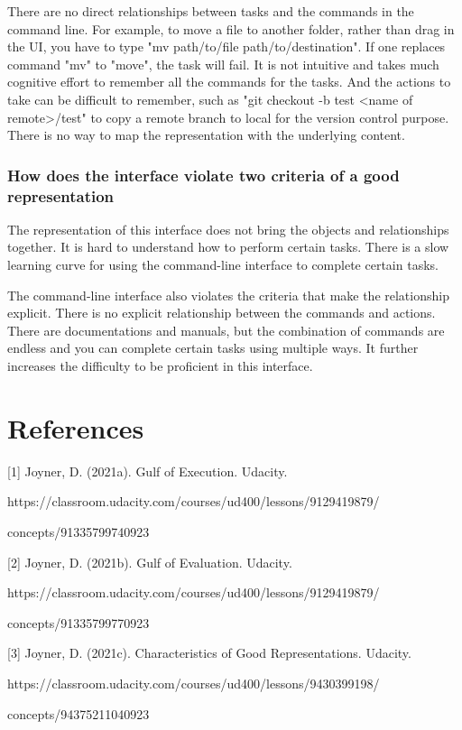 \documentclass[
	letterpaper, %
]{jdf}
\begin{document}
There are no direct relationships between tasks and the commands in the command line. For example, to move a file to another folder, rather than drag in the UI, you have to type "mv path/to/file path/to/destination". If one replaces command "mv" to "move", the task will fail. It is not intuitive and takes much cognitive effort to remember all the commands for the tasks. And the actions to take can be difficult to remember, such as "git checkout -b test <name of remote>/test" to copy a remote branch to local for the version control purpose. There is no way to map the representation with the underlying content.

\subsubsection{How does the interface violate two criteria of a good representation}
The representation of this interface does not bring the objects and relationships together. It is hard to understand how to perform certain tasks. There is a slow learning curve for using the command-line interface to complete certain tasks. 

The command-line interface also violates the criteria that make the relationship explicit. There is no explicit relationship between the commands and actions. There are documentations and manuals, but the combination of commands are endless and you can complete certain tasks using multiple ways. It further increases the difficulty to be proficient in this interface.

\section{References}
[1] Joyner, D. (2021a). Gulf of Execution. Udacity.

https://classroom.udacity.com/courses/ud400/lessons/9129419879/

concepts/91335799740923

[2] Joyner, D. (2021b). Gulf of Evaluation. Udacity.

https://classroom.udacity.com/courses/ud400/lessons/9129419879/

concepts/91335799770923

[3] Joyner, D. (2021c). Characteristics of Good Representations. Udacity.

https://classroom.udacity.com/courses/ud400/lessons/9430399198/

concepts/94375211040923
\end{document}
